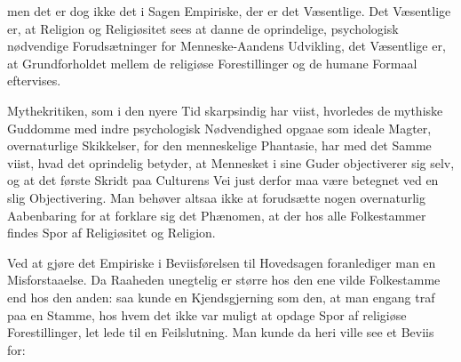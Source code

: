 \documentclass[12pt,a4paper]{book}
\begin{document}
men det er dog ikke det i Sagen Empiriske, der er det Væsentlige. Det Væsentlige
er, at Religion og Religiøsitet sees at danne de oprindelige, psychologisk
nødvendige Forudsætninger for Menneske-Aandens Udvikling, det Væsentlige er, at
Grundforholdet mellem de religiøse Forestillinger og de humane Formaal
eftervises.

Mythekritiken, som i den nyere Tid skarpsindig har viist, hvorledes de mythiske
Guddomme med indre psychologisk Nødvendighed opgaae som ideale Magter,
overnaturlige Skikkelser, for den menneskelige Phantasie, har med det Samme
viist, hvad det oprindelig betyder, at Mennesket i sine Guder objectiverer sig
selv, og at det første Skridt paa Culturens Vei just derfor maa være betegnet
ved en slig Objectivering. Man behøver altsaa ikke at forudsætte nogen
overnaturlig Aabenbaring for at forklare sig det Phænomen, at der hos alle
Folkestammer findes Spor af Religiøsitet og Religion.

Ved at gjøre det Empiriske i Beviisførelsen til Hovedsagen foranlediger man en
Misforstaaelse. Da Raaheden unegtelig er større hos den ene vilde Folkestamme
end hos den anden: saa kunde en Kjendsgjerning som den, at man engang traf paa
en Stamme, hos hvem det ikke var muligt at opdage Spor af religiøse
Forestillinger, let lede til en Feilslutning. Man kunde da heri ville see et
Beviis for:

\end{document}
